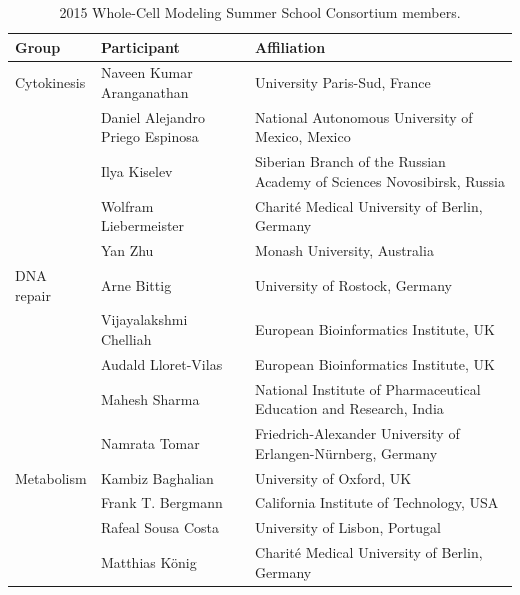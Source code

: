 \documentclass[journal,transmag]{IEEEtran}
\begin{document}

\clearpage
\setcounter{table}{0}
\renewcommand{\thetable}{S\Roman{table}}

\begin{table}[ht!]
\caption{2015 Whole-Cell Modeling Summer School Consortium members.}
\begin{tabularx}{\textwidth}{l||l||X}\hline
\bfseries Group           & \bfseries Participant            & \bfseries Affiliation\\\hline\hline
Cytokinesis               & Naveen Kumar Aranganathan        & University Paris-Sud, France\\
                          & Daniel Alejandro Priego Espinosa & National Autonomous University of Mexico, Mexico\\
                          & Ilya Kiselev                     & Siberian Branch of the Russian Academy of Sciences Novosibirsk, Russia\\
                          & Wolfram Liebermeister            & Charit\'e Medical University of Berlin, Germany\\
                          & Yan Zhu                          & Monash University, Australia\\\hline
DNA repair                & Arne Bittig                      & University of Rostock, Germany\\
                          & Vijayalakshmi Chelliah           & European Bioinformatics Institute, UK\\
                          & Audald Lloret-Vilas              & European Bioinformatics Institute, UK\\
                          & Mahesh Sharma                    & National Institute of Pharmaceutical Education and Research, India\\
                          & Namrata Tomar                    & Friedrich-Alexander University of Erlangen-N\"urnberg, Germany\\\hline
Metabolism                & Kambiz Baghalian                 & University of Oxford, UK\\
                          & Frank T. Bergmann                & California Institute of Technology, USA\\
                          & Rafeal Sousa Costa               & University of Lisbon, Portugal\\
                          & Matthias K\"onig                 & Charit\'e Medical University of Berlin, Germany\\

\end{tabularx}
\end{table}
\end{document}
